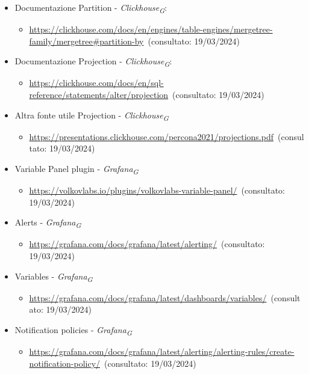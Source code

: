 \begin{itemize}
    \item Documentazione Partition - \textit{Clickhouse}\textsubscript{\textit{G}}: 
    \begin{itemize}
        \item \url{https://clickhouse.com/docs/en/engines/table-engines/mergetree-family/mergetree#partition-by}~(consultato: 19/03/2024)
    \end{itemize}
    \item Documentazione Projection - \textit{Clickhouse}\textsubscript{\textit{G}}: 
    \begin{itemize}
        \item \url{https://clickhouse.com/docs/en/sql-reference/statements/alter/projection}~(consultato: 19/03/2024)
    \end{itemize}
    \item Altra fonte utile Projection - \textit{Clickhouse}\textsubscript{\textit{G}} 
    \begin{itemize}
        \item \url{https://presentations.clickhouse.com/percona2021/projections.pdf}~(consultato: 19/03/2024)
    \end{itemize}
    \item  Variable Panel plugin - \textit{Grafana}\textsubscript{\textit{G}} 
    \begin{itemize}
        \item \url{https://volkovlabs.io/plugins/volkovlabs-variable-panel/}~(consultato: 19/03/2024)
    \end{itemize}
    \item  Alerts - \textit{Grafana}\textsubscript{\textit{G}} 
    \begin{itemize}
        \item \url{https://grafana.com/docs/grafana/latest/alerting/}~(consultato: 19/03/2024)
    \end{itemize}
    \item Variables - \textit{Grafana}\textsubscript{\textit{G}} 
    \begin{itemize}
        \item \url{https://grafana.com/docs/grafana/latest/dashboards/variables/}~(consultato: 19/03/2024)
    \end{itemize}
    \item  Notification policies - \textit{Grafana}\textsubscript{\textit{G}} 
    \begin{itemize}
        \item \url{https://grafana.com/docs/grafana/latest/alerting/alerting-rules/create-notification-policy/}~(consultato: 19/03/2024)

\end{itemize}
\end{itemize}
